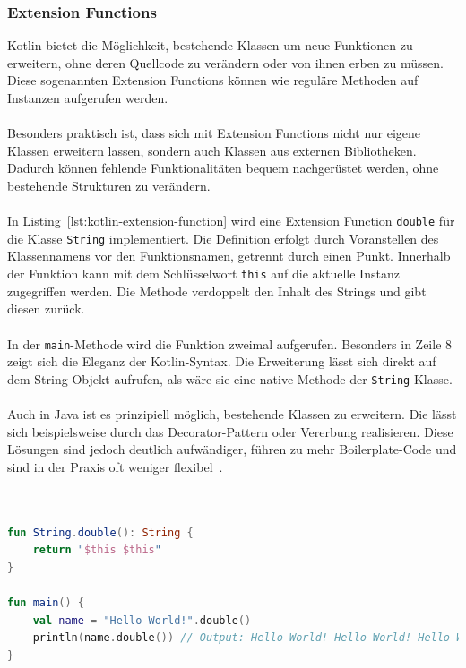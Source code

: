 \documentclass[11pt]{article}
\begin{document}
    \subsubsection{Extension Functions}
    Kotlin bietet die Möglichkeit, bestehende Klassen um neue Funktionen zu erweitern, ohne deren Quellcode zu verändern oder von ihnen erben zu müssen.
    Diese sogenannten Extension Functions können wie reguläre Methoden auf Instanzen aufgerufen werden.\\
    \\
    Besonders praktisch ist, dass sich mit Extension Functions nicht nur eigene Klassen erweitern lassen, sondern auch Klassen aus externen Bibliotheken.
    Dadurch können fehlende Funktionalitäten bequem nachgerüstet werden, ohne bestehende Strukturen zu verändern.\\
    \\
    In Listing~\ref{lst:kotlin-extension-function} wird eine Extension Function \texttt{double} für die Klasse \texttt{String} implementiert.
    Die Definition erfolgt durch Voranstellen des Klassennamens vor den Funktionsnamen, getrennt durch einen Punkt.
    Innerhalb der Funktion kann mit dem Schlüsselwort \texttt{this} auf die aktuelle Instanz zugegriffen werden.
    Die Methode verdoppelt den Inhalt des Strings und gibt diesen zurück.\\
    \\
    In der \texttt{main}-Methode wird die Funktion zweimal aufgerufen.
    Besonders in Zeile 8 zeigt sich die Eleganz der Kotlin-Syntax.
    Die Erweiterung lässt sich direkt auf dem String-Objekt aufrufen, als wäre sie eine native Methode der \texttt{String}-Klasse.\\
    \\
    Auch in Java ist es prinzipiell möglich, bestehende Klassen zu erweitern.
    Die lässt sich beispielsweise durch das Decorator-Pattern oder Vererbung realisieren.
    Diese Lösungen sind jedoch deutlich aufwändiger, führen zu mehr Boilerplate-Code und sind in der Praxis oft weniger flexibel~\cite{kotlin-extensions}.\\
    \\

    \begin{lstlisting}[language=Kotlin, caption={ExtensionFunction.kt}, label={lst:kotlin-extension-function}]

fun String.double(): String {
    return "$this $this"
}

fun main() {
    val name = "Hello World!".double()
    println(name.double()) // Output: Hello World! Hello World! Hello World! Hello World!
}
    \end{lstlisting}
\end{document}

